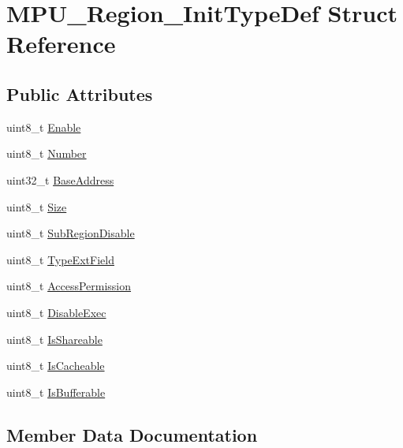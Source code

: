 \hypertarget{struct_m_p_u___region___init_type_def}{}\section{M\+P\+U\+\_\+\+Region\+\_\+\+Init\+Type\+Def Struct Reference}
\label{struct_m_p_u___region___init_type_def}
\subsection*{Public Attributes}
\begin{DoxyCompactItemize}
\item 
uint8\+\_\+t \hyperlink{struct_m_p_u___region___init_type_def_a51f4cbbb7fd437e6b92435e30b003f53}{Enable}
\item 
uint8\+\_\+t \hyperlink{struct_m_p_u___region___init_type_def_ac4f3fbb3f77290e8e6db13d420ba4ed6}{Number}
\item 
uint32\+\_\+t \hyperlink{struct_m_p_u___region___init_type_def_a92dc116f9695e89e028e783afbbf2916}{Base\+Address}
\item 
uint8\+\_\+t \hyperlink{struct_m_p_u___region___init_type_def_ad043bd85298d271490c41b4806766ac7}{Size}
\item 
uint8\+\_\+t \hyperlink{struct_m_p_u___region___init_type_def_acd430a8bee6d8715fd6a06e96380f076}{Sub\+Region\+Disable}
\item 
uint8\+\_\+t \hyperlink{struct_m_p_u___region___init_type_def_acb97237038b91760f8ecb48a21872030}{Type\+Ext\+Field}
\item 
uint8\+\_\+t \hyperlink{struct_m_p_u___region___init_type_def_a2906d8542359b67e1c871bbdebd82a3d}{Access\+Permission}
\item 
uint8\+\_\+t \hyperlink{struct_m_p_u___region___init_type_def_a63dde875f631cc442cbf95bd98f22bd5}{Disable\+Exec}
\item 
uint8\+\_\+t \hyperlink{struct_m_p_u___region___init_type_def_a8dbc521b7c1b8e49f7657718292e2e32}{Is\+Shareable}
\item 
uint8\+\_\+t \hyperlink{struct_m_p_u___region___init_type_def_afce4bf3777de9beda84f379956ee244d}{Is\+Cacheable}
\item 
uint8\+\_\+t \hyperlink{struct_m_p_u___region___init_type_def_aa5f126c8ba90f49f539d5f8d8ec223e0}{Is\+Bufferable}
\end{DoxyCompactItemize}


\subsection{Member Data Documentation}
